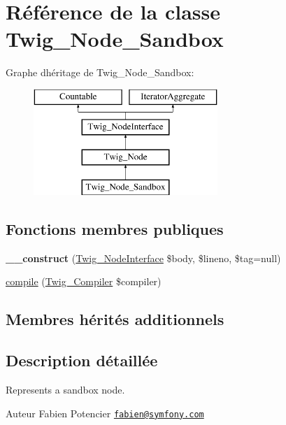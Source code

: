 \hypertarget{class_twig___node___sandbox}{}\section{Référence de la classe Twig\+\_\+\+Node\+\_\+\+Sandbox}
\label{class_twig___node___sandbox}
Graphe d\textquotesingle{}héritage de Twig\+\_\+\+Node\+\_\+\+Sandbox\+:\begin{figure}[H]
\begin{center}
\leavevmode
\includegraphics[height=4.000000cm]{class_twig___node___sandbox}
\end{center}
\end{figure}
\subsection*{Fonctions membres publiques}
\begin{DoxyCompactItemize}
\item 
{\bfseries \+\_\+\+\_\+construct} (\hyperlink{interface_twig___node_interface}{Twig\+\_\+\+Node\+Interface} \$body, \$lineno, \$tag=null)\hypertarget{class_twig___node___sandbox_aa25d55f5106b7cf44145b8565ef8fbbc}{}\label{class_twig___node___sandbox_aa25d55f5106b7cf44145b8565ef8fbbc}

\item 
\hyperlink{class_twig___node___sandbox_a4e0faa87c3fae583620b84d3607085da}{compile} (\hyperlink{class_twig___compiler}{Twig\+\_\+\+Compiler} \$compiler)
\end{DoxyCompactItemize}
\subsection*{Membres hérités additionnels}


\subsection{Description détaillée}
Represents a sandbox node.

\begin{DoxyAuthor}{Auteur}
Fabien Potencier \href{mailto:fabien@symfony.com}{\tt fabien@symfony.\+com} 
\end{DoxyAuthor}


